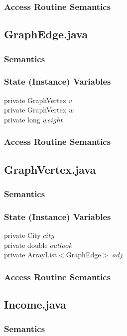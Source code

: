 \documentclass[12pt,fleqn]{article}
\begin{document}
\subsubsection*{Access Routine Semantics}


\subsection*{GraphEdge.java}\label{pedge}

\subsubsection*{Semantics}
\subsubsection*{State (Instance) Variables}
	private GraphVertex $v$\\
	private GraphVertex $w$\\
	private long $weight$
\subsubsection*{Access Routine Semantics}


\subsection*{GraphVertex.java}\label{pvertex}

\subsubsection*{Semantics}
\subsubsection*{State (Instance) Variables}
	private City $city$\\
	private double $outlook$\\
	private ArrayList$<$GraphEdge$>$ $adj$
\subsubsection*{Access Routine Semantics}


\subsection*{Income.java}\label{pincome}


\subsubsection*{Semantics}
\end{document}
